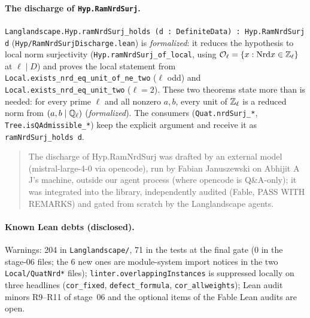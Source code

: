 \paragraph{The discharge of \texttt{Hyp.RamNrdSurj}.} \texttt{Langlandscape.Hyp.ramNrdSurj\_holds (d : DefiniteData) :
Hyp.RamNrdSurj d} (\texttt{Hyp/RamNrdSurjDischarge.lean}) is \emph{formalized}: it reduces the hypothesis to local norm
surjectivity (\texttt{Hyp.ramNrdSurj\_of\_local}, using $\mathcal{O}_\ell=\{x:\mathrm{Nrd} x\in\mathbb{Z}_\ell\}$ at $\ell\mid D$) and proves the
local statement from \texttt{Local.exists\_nrd\_eq\_unit\_of\_ne\_two} ($\ell$ odd) and \texttt{Local.exists\_nrd\_eq\_unit\_two}
($\ell=2$). These two theorems state more than is needed: for every prime $\ell$ and all nonzero $a,b$, every unit of
$\mathbb{Z}_\ell$ is a reduced norm from $(a,b\mid\mathbb{Q}_\ell)$ (\emph{formalized}). The consumers (\texttt{Quat.nrdSurj\_*},
\texttt{Tree.isQAdmissible\_*}) keep the explicit argument and receive it as \texttt{ramNrdSurj\_holds d}.
\begin{quote}\small
The discharge of Hyp.RamNrdSurj was drafted by an external model (mistral-large-4-0 via opencode), run by Fabian Januszewski on Abhijit A J's machine, outside our agent process (where opencode is Q\&A-only); it was integrated into the library, independently audited (Fable, PASS WITH REMARKS) and gated from scratch by the Langlandscape agents.
\end{quote}

\paragraph{Known Lean debts (disclosed).} Warnings: 204 in \texttt{Langlandscape/}, 71 in the tests at the final gate
(0 in the stage-06 files; the 6 new ones are module-system import notices in the two \texttt{Local/QuatNrd*} files); \texttt{linter.overlappingInstances} is suppressed locally on three headlines
(\texttt{cor\_fixed}, \texttt{defect\_formula}, \texttt{cor\_allweights}); Lean audit minors R9--R11 of stage~06 and the
optional items of the Fable Lean audits are open.
